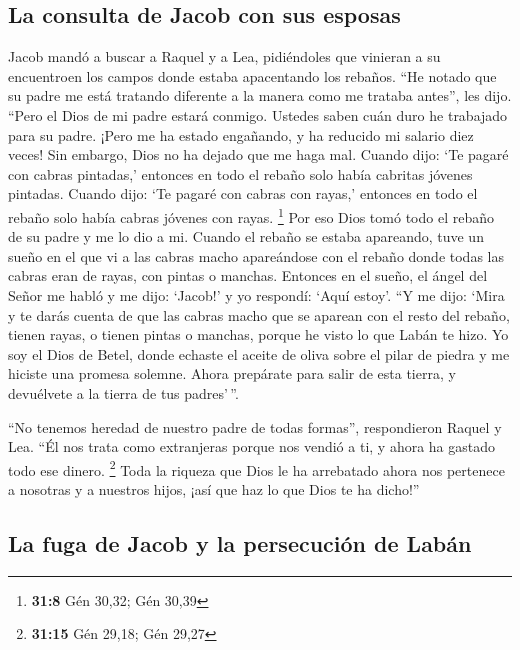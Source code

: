 \hypertarget{la-consulta-de-jacob-con-sus-esposas}{%
\subsection{La consulta de Jacob con sus
esposas}\label{la-consulta-de-jacob-con-sus-esposas}}

 Jacob mandó a buscar a Raquel y a Lea, pidiéndoles que
vinieran a su encuentroen los campos donde estaba apacentando los
rebaños.  ``He notado que su padre me está tratando
diferente a la manera como me trataba antes'', les dijo. ``Pero el Dios
de mi padre estará conmigo.  Ustedes saben cuán duro he
trabajado para su padre.  ¡Pero me ha estado engañando, y
ha reducido mi salario diez veces! Sin embargo, Dios no ha dejado que me
haga mal.  Cuando dijo: `Te pagaré con cabras pintadas,'
entonces en todo el rebaño solo había cabritas jóvenes pintadas. Cuando
dijo: `Te pagaré con cabras con rayas,' entonces en todo el rebaño solo
había cabras jóvenes con rayas. \footnote{\textbf{31:8} Gén 30,32; Gén
  30,39}  Por eso Dios tomó todo el rebaño de su padre y
me lo dio a mi.  Cuando el rebaño se estaba apareando,
tuve un sueño en el que vi a las cabras macho apareándose con el rebaño
donde todas las cabras eran de rayas, con pintas o manchas.
 Entonces en el sueño, el ángel del Señor me habló y me
dijo: `Jacob!' y yo respondí: `Aquí estoy'.  ``Y me dijo:
`Mira y te darás cuenta de que las cabras macho que se aparean con el
resto del rebaño, tienen rayas, o tienen pintas o manchas, porque he
visto lo que Labán te hizo.  Yo soy el Dios de Betel,
donde echaste el aceite de oliva sobre el pilar de piedra y me hiciste
una promesa solemne. Ahora prepárate para salir de esta tierra, y
devuélvete a la tierra de tus padres'\,''.

 ``No tenemos heredad de nuestro padre de todas formas'',
respondieron Raquel y Lea.  ``Él nos trata como
extranjeras porque nos vendió a ti, y ahora ha gastado todo ese dinero.
\footnote{\textbf{31:15} Gén 29,18; Gén 29,27}  Toda la
riqueza que Dios le ha arrebatado ahora nos pertenece a nosotras y a
nuestros hijos, ¡así que haz lo que Dios te ha dicho!''

\hypertarget{la-fuga-de-jacob-y-la-persecuciuxf3n-de-labuxe1n}{%
\subsection{La fuga de Jacob y la persecución de
Labán}\label{la-fuga-de-jacob-y-la-persecuciuxf3n-de-labuxe1n}}

